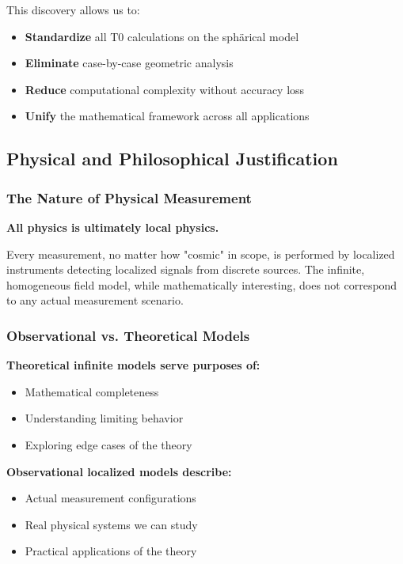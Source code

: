 \documentclass[12pt,a4paper]{article}
\begin{document}
This discovery allows us to:
\begin{itemize}
	\item \textbf{Standardize} all T0 calculations on the sphärical model
	\item \textbf{Eliminate} case-by-case geometric analysis  
	\item \textbf{Reduce} computational complexity without accuracy loss
	\item \textbf{Unify} the mathematical framework across all applications
\end{itemize}

\subsection{Physical and Philosophical Justification}
\label{subsec:philosophical_justification}

\subsubsection{The Nature of Physical Measurement}
\label{subsubsec:nature_physical_measurement}

\begin{tcolorbox}[colback=blue!5!white,colframe=blue!75!black,title=Philosophical Principle]
	\textbf{All physics is ultimately local physics.}
	
	Every measurement, no matter how "cosmic" in scope, is performed by localized instruments detecting localized signals from discrete sources. The infinite, homogeneous field model, while mathematically interesting, does not correspond to any actual measurement scenario.
\end{tcolorbox}

\subsubsection{Observational vs. Theoretical Models}
\label{subsubsec:observational_vs_theoretical}

\textbf{Theoretical infinite models serve purposes of:}
\begin{itemize}
	\item Mathematical completeness
	\item Understanding limiting behavior  
	\item Exploring edge cases of the theory
\end{itemize}

\textbf{Observational localized models describe:}
\begin{itemize}
	\item Actual measurement configurations
	\item Real physical systems we can study
	\item Practical applications of the theory
\end{itemize}
\end{document}
